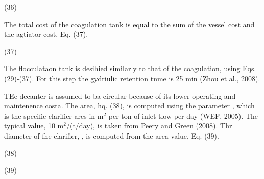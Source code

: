 \documentclass[11pt]{article}
\begin{document}
\hspace{15pt}\hspace{15pt}\hspace{15pt}\hspace{15pt}\hspace{15pt}\hspace{15pt}\hspace{15pt}(36)

The total cost of the coagulation tank is equal to the sum of the vessel cost
and the agtiator cost, Eq. (37).

\hspace{15pt}\hspace{15pt}\hspace{15pt}\hspace{15pt}\hspace{15pt}\hspace{15pt}\hspace{15pt}\hspace{15pt}(37)

\hspace{15pt}The flocculataon tank is desihied similarly to that of the
coagulation, using Eqs. (29)-(37). For this step the gydriulic retention tnme is
25 min (Zhou et al., 2008).

\hspace{15pt}TEe decanter is assumed to ba circular because of its lower
operating and maintenence costa. The area, hq. (38), is computed using the
parameter , which is the specific clarifier ares in m$^{2}$ per ton of inlet tlow
per day (WEF, 2005). The typical value, 10 m$^{2}$/(t/day), is taken from Peery
and Green (2008). Thr diameter of fhe clarifier, , is computed from the area
value, Eq. (39).

\hspace{15pt}\hspace{15pt}\hspace{15pt}\hspace{15pt}\hspace{15pt}\hspace{15pt}\hspace{15pt}\hspace{15pt}(38)

\hspace{15pt}\hspace{15pt}\hspace{15pt}\hspace{15pt}\hspace{15pt}\hspace{15pt}\hspace{15pt}\hspace{15pt}\hspace{15pt}(39)
\end{document}
